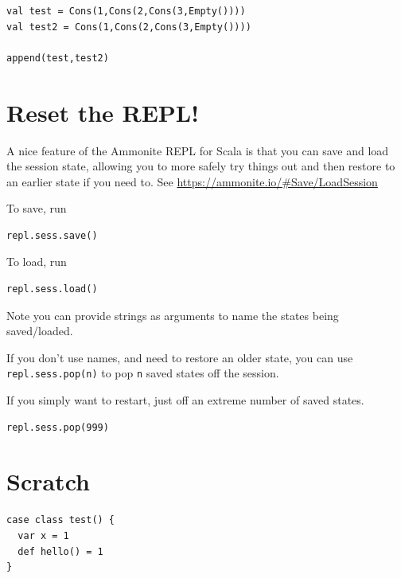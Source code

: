 \documentclass[11pt]{article}
\begin{document}
\begin{verbatim}
val test = Cons(1,Cons(2,Cons(3,Empty())))
val test2 = Cons(1,Cons(2,Cons(3,Empty())))

append(test,test2)
\end{verbatim}

\section{Reset the REPL!}
\label{sec:org3faca14}
A nice feature of the Ammonite REPL for Scala
is that you can save and load the session state,
allowing you to more safely try things out
and then restore to an earlier state if you need to.
See \url{https://ammonite.io/\#Save/LoadSession}

To save, run
\begin{verbatim}
repl.sess.save()
\end{verbatim}

To load, run
\begin{verbatim}
repl.sess.load()
\end{verbatim}

Note you can provide strings as arguments to name the states
being saved/loaded.

If you don't use names, and need to restore an older state,
you can use \texttt{repl.sess.pop(n)} to pop \texttt{n} saved states off the session.

If you simply want to restart, just off an extreme number
of saved states.
\begin{verbatim}
repl.sess.pop(999)
\end{verbatim}

\section{Scratch}
\label{sec:org5e195e6}
\begin{verbatim}
case class test() {
  var x = 1
  def hello() = 1
}
\end{verbatim}
\end{document}
